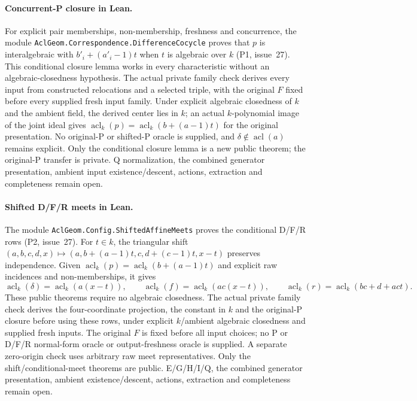 \documentclass[11pt,oneside]{article}
\theoremstyle{definition}
\theoremstyle{remark}
\newcommand{\acl}{\operatorname{acl}}
\newcommand{\lean}[1]{\nolinkurl{#1}}
\begin{document}
\paragraph{Concurrent-P closure in Lean.}
For explicit pair memberships, non-membership, freshness and concurrence,
the module \lean{AclGeom.Correspondence.DifferenceCocycle} proves that
$p$ is interalgebraic with $b'_i+(a'_i-1)t$ when $t$ is algebraic over
$k$ (P1, issue~27). This conditional closure lemma works in every
characteristic without an algebraic-closedness hypothesis.
The actual private family check derives every input from constructed
relocations and a selected triple, with the original $F$ fixed before
every supplied fresh input family. Under explicit algebraic closedness of
$k$ and the ambient field, the derived center lies in $k$; an actual
$k$-polynomial image of the joint ideal gives
$\acl_k(p)=\acl_k(b+(a-1)t)$ for the original presentation.
No original-P or shifted-P oracle is supplied, and
$\delta\notin\acl(a)$ remains explicit. Only the conditional closure lemma
is a new public theorem; the original-P transfer is private. Q
normalization, the combined generator presentation, ambient input
existence/descent, actions, extraction and completeness remain open.

\paragraph{Shifted D/F/R meets in Lean.}
The module \lean{AclGeom.Config.ShiftedAffineMeets} proves
the conditional D/F/R rows (P2, issue~27).
For $t\in k$, the triangular shift
$(a,b,c,d,x)\mapsto(a,b+(a-1)t,c,d+(c-1)t,x-t)$ preserves independence.
Given $\acl_k(p)=\acl_k(b+(a-1)t)$ and explicit raw incidences and
non-memberships, it gives
\[
 \acl_k(\delta)=\acl_k(a(x-t)),\qquad
 \acl_k(f)=\acl_k(ac(x-t)),\qquad
 \acl_k(r)=\acl_k(bc+d+act).
\]
These public theorems require no algebraic closedness.
The actual private family check derives the four-coordinate projection,
the constant in $k$ and the original-P closure before using these rows,
under explicit $k$/ambient algebraic closedness and supplied fresh inputs.
The original $F$ is fixed before all input choices; no P or D/F/R
normal-form oracle or output-freshness oracle is supplied.
A separate zero-origin check uses arbitrary raw meet representatives.
Only the shift/conditional-meet theorems are public.
E/G/H/I/Q, the combined generator presentation, ambient existence/descent,
actions, extraction and completeness remain open.
\end{document}
